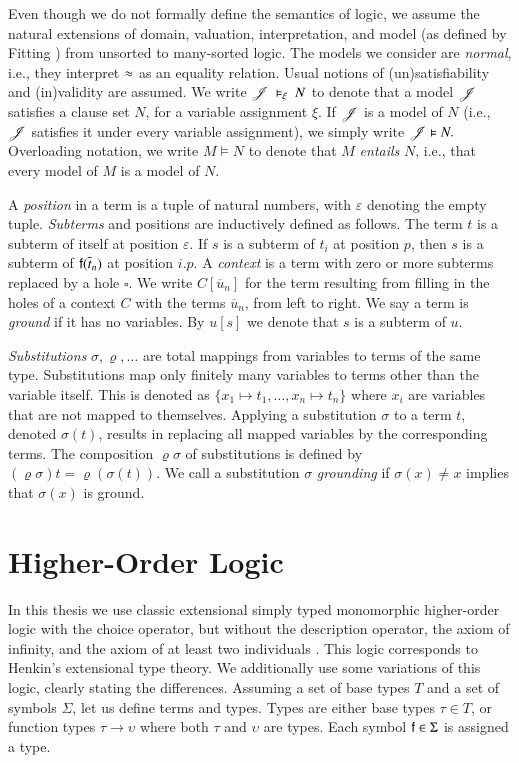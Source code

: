 Even though we do not formally define the semantics of logic, we assume the natural
extensions of domain, valuation, interpretation, and model (as defined by Fitting
\cite{mf-1996-fol}) from unsorted to many-sorted logic. The models we consider are
\emph{normal}, i.e., they interpret $\approx$ as an equality relation. Usual notions
of (un)satisfiability and (in)validity are assumed. We write
$\mathscr{J}~\vDash_\xi~N$ to denote that a model $\mathscr{J}$ satisfies a clause
set $N$, for a variable assignment $\xi$. If $\mathscr{J}$ is a model of $N$
(i.e., $\mathscr{J}$ satisfies it under every variable assignment), we simply write
$\mathscr{J} \vDash N.$  Overloading notation, we write $M \models N$ to denote that
$M$ \emph{entails} $N$, i.e., that every model of $M$ is a model of $N.$

A {\em position} in a term is a tuple of natural numbers, with $\varepsilon$
denoting the empty tuple. {\em Subterms} and positions are inductively defined
as follows. The term $t$ is a subterm of itself at position $\varepsilon$. If
$s$ is a subterm of $t_i$ at position $p$, then $s$ is a subterm of
$\mathsf{f}(\overline{t}_{n})$ at position $i.p$. A {\em context} is a term with zero or
more subterms replaced by a hole $\square$. We write $C[\overline{u}_n]$ for the
term resulting from filling in the holes of a context $C$ with the terms
$\overline{u}_n$, from left to right. We say a term is {\em ground} if it has no
variables. By $u[s]$ we denote that $s$ is a subterm of $u$. 

{\em Substitutions} $\sigma, \varrho, \ldots$ are total mappings from variables to
terms of the same type. Substitutions map only finitely many variables to terms
other than the variable itself. This is denoted as $\{ x_1 \mapsto t_1, \ldots,
x_n \mapsto t_n \}$ where $x_i$ are variables that are not mapped to themselves.
Applying a substitution $\sigma$ to a term $t$, denoted $\sigma(t)$, results in
replacing all mapped variables by the corresponding terms.
The composition $\varrho\sigma$ of substitutions is defined by
$\left(\varrho\sigma\right)t=\varrho\left(\sigma (t)\right)$. We call a substitution $\sigma$ {\em grounding}
if $\sigma(x) \not= x$ implies that $\sigma(x)$ is ground.

\section{Higher-Order Logic}
\label{sec:pre:hol}

In this thesis we use classic extensional simply typed monomorphic higher-order
logic with the choice operator, but without the description operator, the axiom of infinity,
and the axiom of at least two individuals \cite[Sect.~3.5]{bm-14-automation-ho}.
This logic corresponds to Henkin's extensional type theory. We additionally use
some variations of this logic, clearly stating the differences. Assuming a set of
base types $T$ and a set of symbols $\Sigma$, let us define terms and types.
Types are either base types $\tau \in T$, or function types $\tau \rightarrow
\upsilon$ where both $\tau$ and $\upsilon$ are types. Each symbol $\mathsf{f} \in
\Sigma$ is assigned a type.

